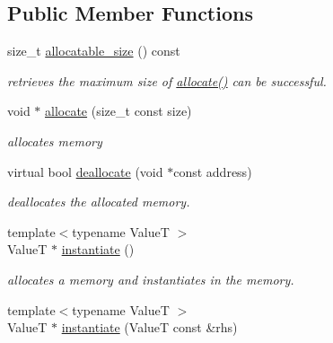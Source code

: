\subsection*{Public Member Functions}
\begin{DoxyCompactItemize}
\item 
size\-\_\-t \hyperlink{classhryky_1_1memory_1_1heap_1_1_base_ae760477ddca7ffdfc1e950946d9179fb}{allocatable\-\_\-size} () const 
\begin{DoxyCompactList}\small\item\em retrieves the maximum size of \hyperlink{classhryky_1_1memory_1_1heap_1_1_base_a068b1ee5b4e759df5e19dff37eecaf92}{allocate()} can be successful. \end{DoxyCompactList}\item 
void $\ast$ \hyperlink{classhryky_1_1memory_1_1heap_1_1_base_a068b1ee5b4e759df5e19dff37eecaf92}{allocate} (size\-\_\-t const size)
\begin{DoxyCompactList}\small\item\em allocates memory \end{DoxyCompactList}\item 
virtual bool \hyperlink{classhryky_1_1memory_1_1heap_1_1_base_ac9629d3eb869729c475d9c8edf28461c}{deallocate} (void $\ast$const address)
\begin{DoxyCompactList}\small\item\em deallocates the allocated memory. \end{DoxyCompactList}\item 
\hypertarget{classhryky_1_1memory_1_1heap_1_1_base_a147663574da9f0202cbfbc139358ae6b}{{\footnotesize template$<$typename Value\-T $>$ }\\Value\-T $\ast$ \hyperlink{classhryky_1_1memory_1_1heap_1_1_base_a147663574da9f0202cbfbc139358ae6b}{instantiate} ()}\label{classhryky_1_1memory_1_1heap_1_1_base_a147663574da9f0202cbfbc139358ae6b}

\begin{DoxyCompactList}\small\item\em allocates a memory and instantiates in the memory. \end{DoxyCompactList}\item 
\hypertarget{classhryky_1_1memory_1_1heap_1_1_base_a7faca1782110d1dc7089caaede624444}{{\footnotesize template$<$typename Value\-T $>$ }\\Value\-T $\ast$ \hyperlink{classhryky_1_1memory_1_1heap_1_1_base_a7faca1782110d1dc7089caaede624444}{instantiate} (Value\-T const \&rhs)}\label{classhryky_1_1memory_1_1heap_1_1_base_a7faca1782110d1dc7089caaede624444}


\end{DoxyCompactItemize}
